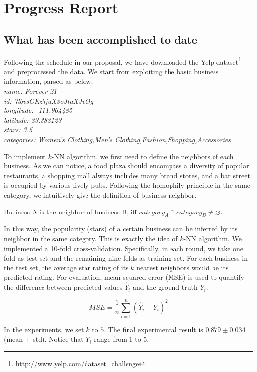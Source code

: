 \section*{Progress Report}
\subsection{What has been accomplished to date}

Following the schedule in our proposal, we have downloaded the Yelp dataset\footnote{http://www.yelp.com/dataset\_challenge} and preprocessed the data. We start from exploiting the basic business information, parsed as below:\\
\emph{
\small
\indent name: Forever 21\\
\indent id: 7lbvsGKzhjuX3oJtaXJvOg\\
\indent longitude: -111.964485\\
\indent latitude: 33.383123\\
\indent stars: 3.5\\
\indent categories: Women's Clothing,Men's Clothing,Fashion,Shopping,Accessories
}

To implement $k$-NN algorithm, we first need to define the neighbors of each business. As we can notice, a food plaza should encompass a diversity of popular restaurants, a shopping mall always includes many brand stores, and a bar street is occupied by various lively pubs. Following the homophily principle in the same category, we intuitively give the definition of business neighbor.

\begin{defn}
Business A is the neighbor of business B, iff $category_A \cap category_B \neq \varnothing$.
\end{defn}

In this way, the popularity (stars) of a certain business can be inferred by its neighbor in the same category. This is exactly the idea of $k$-NN algorithm. We implemented a 10-fold cross-validation. Specifically, in each round, we take one fold as test set and the remaining nine folds as training set. For each business in the test set, the average star rating of its $k$ nearest neighbors would be its predicted rating. For evaluation, mean squared error (MSE) is used to quantify the difference between predicted values $\hat{Y}_i$ and the ground truth $Y_i$.

$$MSE=\frac{1}{n}\sum_{i=1}^{n}(\hat{Y}_i-Y_i)^2$$

In the experiments, we set $k$ to $5$. The final experimental result is $0.879 \pm 0.034$ (mean $\pm$ std).
Notice that $Y_i$ range from 1 to 5.

